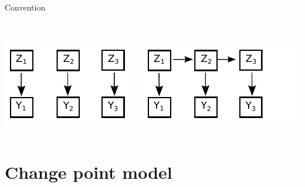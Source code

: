 \documentclass{beamer}\usepackage[]{graphicx}\usepackage[]{color}
\begin{document}
\begin{frame}{Convention}
\begin{columns}
\begin{column}{0.3\textwidth}
\\ \smallskip
\includegraphics[scale=0.4]{Dag2.pdf}
\end{column}
\pause
\begin{column}{0.3\textwidth}
\\ \smallskip
\includegraphics[scale=0.4]{Dag3.pdf}
\end{column}
\end{columns}
\end{frame}

\section{Change point model}
\end{document}
